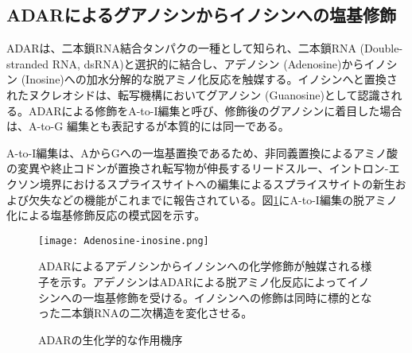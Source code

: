 \subsection{ADARによるグアノシンからイノシンへの塩基修飾}
ADARは、二本鎖RNA結合タンパクの一種として知られ、二本鎖RNA (Double-stranded RNA, dsRNA)と選択的に結合し、アデノシン (Adenosine)からイノシン (Inosine)への加水分解的な脱アミノ化反応を触媒する。イノシンへと置換されたヌクレオシドは、転写機構においてグアノシン (Guanosine)として認識される。ADARによる修飾をA-to-I編集と呼び、修飾後のグアノシンに着目した場合は、A-to-G 編集とも表記するが本質的には同一である。
\par
A-to-I編集は、AからGへの一塩基置換であるため、非同義置換によるアミノ酸の変異や終止コドンが置換され転写物が伸長するリードスルー、イントロン-エクソン境界におけるスプライスサイトへの編集によるスプライスサイトの新生および欠失などの機能がこれまでに報告されている。図\ref{fig:Chemical_reaction}にA-to-I編集の脱アミノ化による塩基修飾反応の模式図を示す。
\begin{figure}[!h]
	\begin{center}
		\texttt{[image: Adenosine-inosine.png]}
	\end{center}
	\caption{ADARの生化学的な作用機序}
	\begin{flushleft}
		\small{ADARによるアデノシンからイノシンへの化学修飾が触媒される様子を示す。アデノシンはADARによる脱アミノ化反応によってイノシンへの一塩基修飾を受ける。イノシンへの修飾は同時に標的となった二本鎖RNAの二次構造を変化させる。}
	\end{flushleft}
	\label{fig:Chemical_reaction}
\end{figure}

